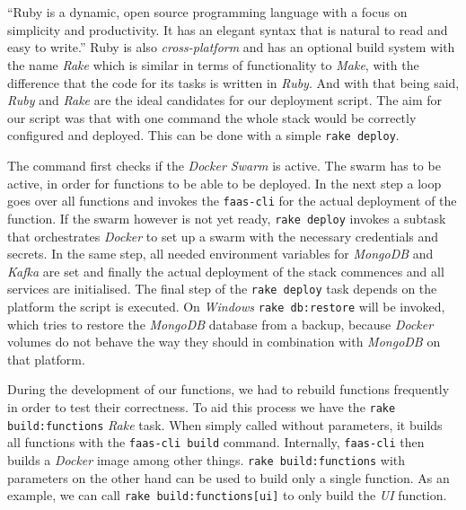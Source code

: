 \section{}

“Ruby is a dynamic, open source programming language with a focus on simplicity and productivity. It
has an elegant syntax that is natural to read and easy to write.” \cite{ruby} Ruby is also
\textit{cross-platform} and has an optional build system with the name \textit{Rake} which is
similar in terms of functionality to \textit{Make}, with the difference that the code for its tasks
is written in \textit{Ruby}. And with that being said, \textit{Ruby} and \textit{Rake} are the ideal
candidates for our deployment script. The aim for our script was that with one command the whole
stack would be correctly configured and deployed. This can be done with a simple
\lstinline{rake deploy}.

The command first checks if the \textit{Docker Swarm} is active. The swarm has to be active, in
order for functions to be able to be deployed. In the next step a loop goes over all functions and
invokes the \texttt{faas-cli} for the actual deployment of the function. If the swarm however is not
yet ready, \lstinline{rake deploy} invokes a subtask that orchestrates \textit{Docker} to set up a
swarm with the necessary credentials and secrets. In the same step, all needed environment variables
for \textit{MongoDB} and \textit{Kafka} are set and finally the actual deployment of the stack
commences and all services are initialised. The final step of the \lstinline{rake deploy} task
depends on the platform the script is executed. On \textit{Windows} \lstinline{rake db:restore} will
be invoked, which tries to restore the \textit{MongoDB} database from a backup, because
\textit{Docker} volumes do not behave the way they should in combination with \textit{MongoDB} on
that platform.

During the development of our functions, we had to rebuild functions frequently in order to test
their correctness. To aid this process we have the \lstinline{rake build:functions} \textit{Rake}
task. When simply called without parameters, it builds all functions with the \texttt{faas-cli
build} command. Internally, \texttt{faas-cli} then builds a \textit{Docker} image among other
things. \lstinline{rake build:functions} with parameters on the other hand can be used to build only
a single function. As an example, we can call \lstinline{rake build:functions[ui]} to only build the
\textit{UI} function.

